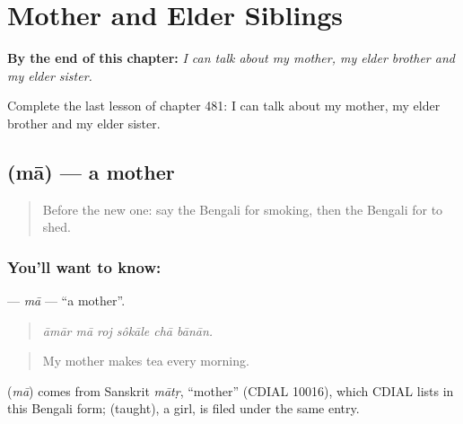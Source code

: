 
\chapter{Mother and Elder Siblings}
\label{ch:bn-mother-and-elder-siblings}

\begin{chapteropening}
\textbf{By the end of this chapter:} \emph{I can talk about my mother, my elder brother and my elder sister.}

Complete the last lesson of chapter 481: I can talk about my mother, my elder brother and my elder sister.
\end{chapteropening}

\section[\texorpdfstring{\bn{মা} (mā)}{মা (mā)}]{ (mā) — a mother}

\label{lesson:BN-C481-ma}



\begin{quote}
Before the new one: say the Bengali for smoking, then the Bengali for to shed.
\end{quote}

\subsection*{You'll want to know: }
\textbf{} — \emph{mā} — \textquotedblleft{}a mother\textquotedblright{}.

\begin{quote}
     
\end{quote}

\begin{quote}
\emph{āmār mā roj sôkāle chā bānān.}
\end{quote}

\begin{quote}
My mother makes tea every morning.
\end{quote}

\begin{cousinweb}
\textbf{} (\emph{mā}) comes from Sanskrit \emph{mātṛ}, \textquotedblleft{}mother\textquotedblright{} (CDIAL 10016), which CDIAL lists in this Bengali form;  (taught), a girl, is filed under the same entry.
\end{cousinweb}

